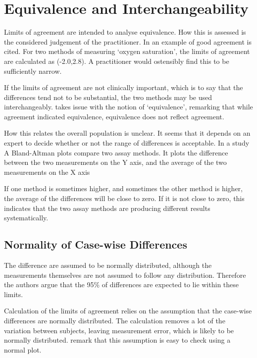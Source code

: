 \documentclass[12pt, a4paper]{report}
\theoremstyle{plain}
\theoremstyle{definition}
\theoremstyle{remark}
\begin{document}






\section{Equivalence and Interchangeability}
Limits of agreement are intended to analyse equivalence. How this
is assessed is the considered judgement of the practitioner. In
\citet{BA86} an example of good agreement is cited. For two
methods of measuring `oxygen saturation', the limits of agreement
are calculated as (-2.0,2.8). A practitioner would ostensibly find
this to be sufficiently narrow.

If the limits of agreement are not clinically important, which is
to say that the differences tend not to be substantial, the two
methods may be used interchangeably. \citet{DunnSEME} takes issue
with the notion of `equivalence', remarking that while agreement
indicated equivalence, equivalence does not reflect agreement.



How this relates the overall population is unclear. It seems that
it depends on an expert to decide whether or not the range of
differences is acceptable. In a study A Bland-Altman plots compare
two assay methods. It plots the difference between the two
measurements on the Y axis, and the average of the two
measurements on the X axis

	
	If one method is sometimes higher, and sometimes the other method is higher, the average of the differences will be close to zero.
	If it is not close to zero, this indicates that the two assay methods are producing different results systematically.

\subsection{Normality of Case-wise Differences}	
The difference are assumed to be normally distributed, although the measurements themselves are not assumed to follow any distribution. Therefore the authors argue that the 95\% of differences are expected to lie within these limits. 

Calculation of the limits of agreement relies on the assumption that the case-wise differences are normally distributed.
The calculation removes a lot of the variation between subjects,  leaving measurement error, which is likely to be normally distributed.\citet{BA99} remark that this assumption is easy to check using a normal plot. 
\end{document}
